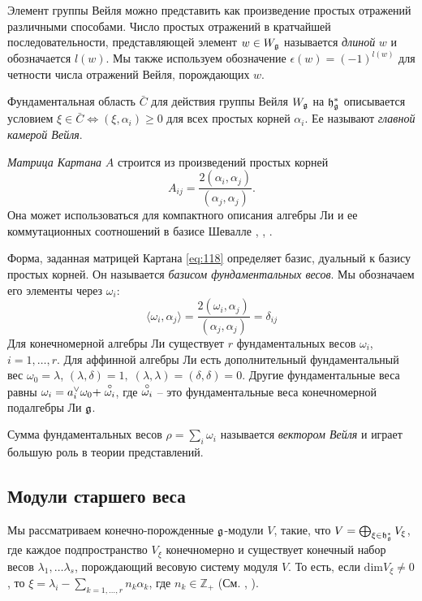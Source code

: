 Элемент группы Вейля можно представить как произведение простых отражений различными способами. Число простых отражений в кратчайшей последовательности, представляющей элемент\; $w\in W_{\mathfrak{g}}$ называется {\it длиной}  $w$ и обозначается $l(w)$. Мы также используем обозначение $\epsilon(w)=(-1)^{l(w)}$ для четности числа отражений Вейля, порождающих $w$. 

Фундаментальная область $\bar{C}$ для действия группы Вейля $W_{\mathfrak{g}}$ на $\mathfrak{h}_{\mathfrak{g}}^{*}$ описывается условием $\xi\in \bar{C}\Leftrightarrow (\xi,\alpha_{i})\geq 0$ для всех простых корней $\alpha_{i}$. Ее называют {\it главной камерой Вейля}. 

{\it Матрица Картана} $A$ строится из произведений простых корней
\begin{equation}
  \label{eq:118}
  A_{ij}=\frac{2(\alpha_{i},\alpha_{j})}{(\alpha_{j},\alpha_{j})}.
\end{equation}
Она может использоваться для компактного описания алгебры Ли и ее коммутационных соотношений в базисе Шевалле \cite{humphreys1997introduction}, \cite{fulton1991representation}, \cite{bourbaki2002lie}.

Форма, заданная матрицей Картана \eqref{eq:118} определяет базис, дуальный к базису простых корней.  Он называется  {\it базисом фундаментальных весов}. Мы обозначаем его элементы через $\omega_i$:
\begin{equation}
  \label{eq:20}
  \langle\omega_i,\alpha_j\rangle=\frac{2(\omega_{i},\alpha_{j})}{(\alpha_{j},\alpha_{j})}=\delta_{ij}
\end{equation}
Для конечномерной алгебры Ли существует $r$ фундаментальных весов $\omega_{i}$, $i=1,\dots, r$. Для аффинной алгебры Ли есть дополнительный фундаментальный вес $\omega_0=\lambda$, $(\lambda,\delta)=1, \; (\lambda,\lambda)=(\delta,\delta)=0$. Другие фундаментальные веса равны $\omega_i=a_i^{\vee} \omega_0 +\stackrel{\circ }{\omega_i}$, где $\stackrel{\circ }{\omega_i}$ -- это фундаментальные веса конечномерной подалгебры Ли $\mathfrak{g}$.

Сумма фундаментальных весов $\rho=\sum_{i} \omega_{i}$ называется {\it вектором Вейля} и играет большую роль в теории представлений.

\subsection{Модули старшего веса}
\label{sec:high-weight-modul}

Мы рассматриваем конечно-порожденные  $\mathfrak{g}$-модули $V$, такие, что $V=\bigoplus_{\xi\in \mathfrak{h}_{\mathfrak{g}}^{*}} V_{\xi}$, где каждое подпространство $V_{\xi}$ конечномерно и существует конечный набор весов $\lambda_{1},\dots \lambda_{s}$, порождающий весовую систему модуля $V$. То есть, если $\mathrm{dim}V_{\xi}\neq 0$, то $\xi=\lambda_{i}-\sum_{k=1,\dots, r} n_{k}\alpha_{k}$, где $n_{k}\in \mathbb{Z}_{+}$ (См.  \cite{humphreys2008representations}, \cite{carter2005lie}).

